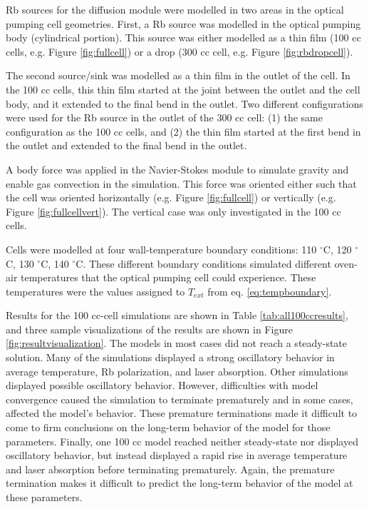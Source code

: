 Rb sources for the diffusion module were modelled in two areas in the optical pumping cell geometries. First, a Rb source was modelled in the optical pumping body (cylindrical portion). This source was either modelled as a thin film (100 cc cells, e.g. Figure \ref{fig:fullcell}) or a drop (300 cc cell, e.g. Figure \ref{fig:rbdropcell}).

The second source/sink was modelled as a thin film in the outlet of the cell. In the 100 cc cells, this thin film started at the joint between the outlet and the cell body, and it extended to the final bend in the outlet. Two different configurations were used for the Rb source in the outlet of the 300 cc cell: (1) the same configuration as the 100 cc cells, and (2) the thin film started at the first bend in the outlet and extended to the final bend in the outlet.  

A body force was applied in the Navier-Stokes module to simulate gravity and enable gas convection in the simulation. This force was oriented either such that the cell was oriented horizontally (e.g. Figure \ref{fig:fullcell}) or vertically (e.g. Figure \ref{fig:fullcellvert}). The vertical case was only investigated in the 100 cc cells.

Cells were modelled at four wall-temperature boundary conditions: 110 $^{\circ}$C, 120 $^{\circ}$C, 130 $^{\circ}$C, 140 $^{\circ}$C. These different boundary conditions simulated different oven-air temperatures that the optical pumping cell could experience. These temperatures were the values assigned to $T_{ext}$ from eq. \ref{eq:tempboundary}. 

Results for the 100 cc-cell simulations are shown in Table \ref{tab:all100ccresults}, and three sample visualizations of the results are shown in Figure \ref{fig:resultvisualization}. The models in most cases did not reach a steady-state solution. Many of the simulations displayed a strong oscillatory behavior in average temperature, Rb polarization, and laser absorption. Other simulations displayed possible oscillatory behavior. However, difficulties with model convergence caused the simulation to terminate prematurely and in some cases, affected the model's behavior. These premature terminations made it difficult to come to firm conclusions on the long-term behavior of the model for those parameters. Finally, one 100 cc model reached neither steady-state nor displayed oscillatory behavior, but instead displayed a rapid rise in average temperature and laser absorption before terminating prematurely. Again, the premature termination makes it difficult to predict the long-term behavior of the model at these parameters.

